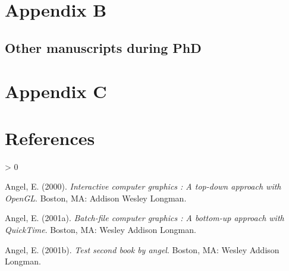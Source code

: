 \documentclass[12pt,twoside]{reedthesis}
\newlength{\cslhangindent}
\newenvironment{CSLReferences}[2] %
 {%
  \setlength{\parindent}{0pt}
  \ifodd #1 \everypar{\setlength{\hangindent}{\cslhangindent}}\ignorespaces\fi
  \ifnum #2 > 0
  \setlength{\parskip}{#2\baselineskip}
  \fi
 }%
 {}
\begin{document}
\hypertarget{ab}{%
\chapter*{Appendix B}\label{ab}}

\hypertarget{other-manuscripts-during-phd}{%
\section{Other manuscripts during PhD}\label{other-manuscripts-during-phd}}

\hypertarget{ac}{%
\chapter*{Appendix C}\label{ac}}

\backmatter

\hypertarget{references-2}{%
\chapter*{References}\label{references-2}}


\noindent

\setlength{\parindent}{-0.20in}

\hypertarget{refs}{}
\begin{CSLReferences}{1}{0}
\leavevmode\hypertarget{ref-angel2000}{}%
Angel, E. (2000). \emph{Interactive computer graphics : A top-down approach with OpenGL}. Boston, MA: Addison Wesley Longman.

\leavevmode\hypertarget{ref-angel2001}{}%
Angel, E. (2001a). \emph{Batch-file computer graphics : A bottom-up approach with QuickTime}. Boston, MA: Wesley Addison Longman.

\leavevmode\hypertarget{ref-angel2002a}{}%
Angel, E. (2001b). \emph{Test second book by angel}. Boston, MA: Wesley Addison Longman.

\end{CSLReferences}

\end{document}
